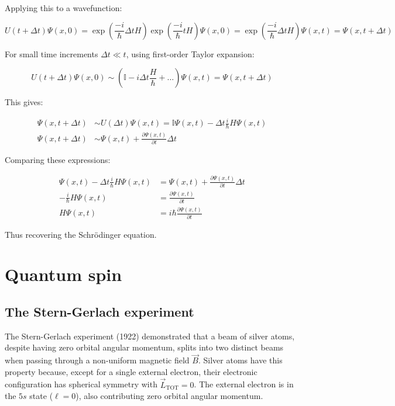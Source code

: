 \documentclass[italian]{HKNdocument}
\begin{document}
Applying this to a wavefunction:

\begin{equation}
U(t+\Delta t) \Psi(x, 0)=\exp \left(\frac{-i}{\hbar} \Delta t H\right) \exp \left(\frac{-i}{\hbar} t H\right) \Psi(x, 0)=\exp \left(\frac{-i}{\hbar} \Delta t H\right) \Psi(x, t)=\Psi(x, t+\Delta t)
\end{equation}

For small time increments $\Delta t \ll t$, using first-order Taylor expansion:

\begin{equation}
U(t+\Delta t) \Psi(x, 0) \sim\left(\mathbb{I}-i \Delta t \frac{H}{\hbar}+\ldots\right) \Psi(x, t)=\Psi(x, t+\Delta t)
\end{equation}

This gives:

\begin{align}
\Psi(x, t+\Delta t) & \sim U(\Delta t) \Psi(x, t)=\mathbb{I} \Psi(x, t)-\Delta t \frac{i}{\hbar} H \Psi(x, t)  \\
\Psi(x, t+\Delta t) & \sim \Psi(x, t)+\frac{\partial \Psi(x, t)}{\partial t} \Delta t
\end{align}

Comparing these expressions:

\begin{align}
\Psi(x, t)-\Delta t \frac{i}{\hbar} H \Psi(x, t) & =\Psi(x, t)+\frac{\partial \Psi(x, t)}{\partial t} \Delta t \\
-\frac{i}{\hbar} H \Psi(x, t) & =\frac{\partial \Psi(x, t)}{\partial t}  \\
H \Psi(x, t) & =i \hbar \frac{\partial \Psi(x, t)}{\partial t}
\end{align}

Thus recovering the Schrödinger equation.

\section{Quantum spin}
\subsection{The Stern-Gerlach experiment}
The Stern-Gerlach experiment (1922) demonstrated that a beam of silver atoms, despite having zero orbital angular momentum, splits into two distinct beams when passing through a non-uniform magnetic field $\vec{B}$. Silver atoms have this property because, except for a single external electron, their electronic configuration has spherical symmetry with $\vec{L}_{\text{TOT}}=0$. The external electron is in the $5s$ state ($\ell=0$), also contributing zero orbital angular momentum.
\end{document}
